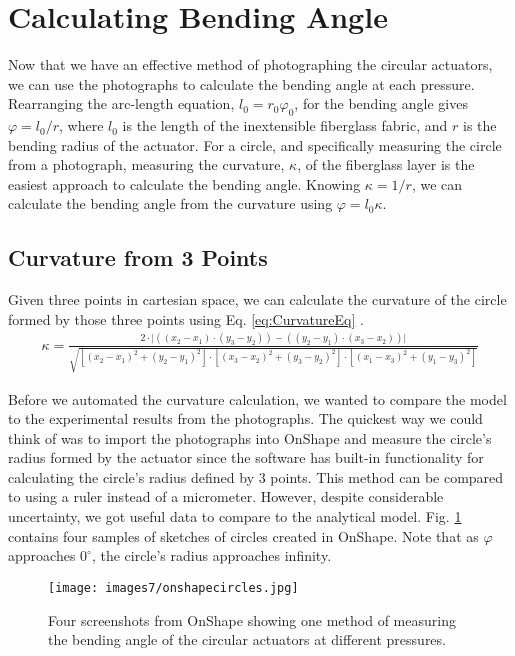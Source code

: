 \section{Calculating Bending Angle}

Now that we have an effective method of photographing the circular actuators, we can use the photographs to calculate the bending angle at each pressure. Rearranging the arc-length equation, $l_{0} = r_{0}\varphi_{0}$, for the bending angle gives $\varphi = l_0/r$, where $l_0$ is the length of the inextensible fiberglass fabric, and $r$ is the bending radius of the actuator. For a circle, and specifically measuring the circle from a photograph, measuring the curvature, $\kappa$, of the fiberglass layer is the easiest approach to calculate the bending angle. Knowing $\kappa = 1/r$, we can calculate the bending angle from the curvature using $\varphi = l_{0}\kappa$. 

\subsection{Curvature from 3 Points}

Given three points in cartesian space, we can calculate the curvature of the circle formed by those three points using Eq. \ref{eq:CurvatureEq} \cite{ratliff_cartesian_2019}. 
\begin{align} 
    \kappa = \frac{2\cdot\lvert((x_2-x_1)\cdot(y_3-y_2)) - ((y_2-y_1)\cdot(x_3-x_2))\rvert}{\sqrt{[(x_2-x_1)^2+(y_2-y_1)^2] \cdot [(x_3-x_2)^2+(y_3-y_2)^2] \cdot [(x_1-x_3)^2+(y_1-y_3)^2]}} 
    \label{eq:CurvatureEq} 
\end{align}

Before we automated the curvature calculation, we wanted to compare the model to the experimental results from the photographs. The quickest way we could think of was to import the photographs into OnShape and measure the circle's radius formed by the actuator since the software has built-in functionality for calculating the circle's radius defined by 3 points. This method can be compared to using a ruler instead of a micrometer. However, despite considerable uncertainty, we got useful data to compare to the analytical model. Fig. \ref{fig:onshapecircles} contains four samples of sketches of circles created in OnShape. Note that as $\varphi$ approaches $0^\circ$, the circle's radius approaches infinity. 

\begin{figure}[h]
    \centering
     \texttt{[image: images7/onshapecircles.jpg]}
    \caption{Four screenshots from OnShape showing one method of measuring the bending angle of the circular actuators at different pressures.}
    \label{fig:onshapecircles}
\end{figure}


